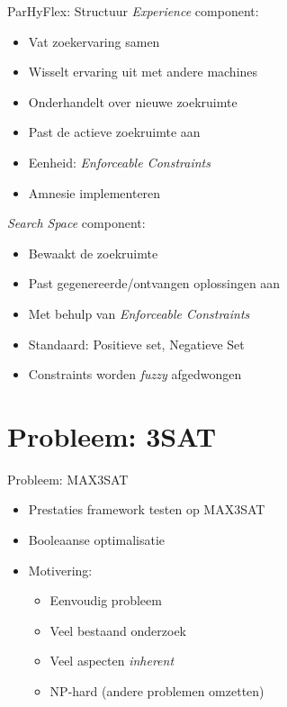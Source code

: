 \documentclass{beamer}
\begin{document}
\begin{frame}{ParHyFlex: Structuur}
\emph{Experience} component:
\begin{itemize}
 \item Vat zoekervaring samen
 \item Wisselt ervaring uit met andere machines
 \item Onderhandelt over nieuwe zoekruimte
 \item Past de actieve zoekruimte aan
 \item Eenheid: \emph{Enforceable Constraints}
 \item Amnesie implementeren
\end{itemize}
\emph{Search Space} component:
\begin{itemize}
 \item Bewaakt de zoekruimte
 \item Past gegenereerde/ontvangen oplossingen aan
 \item Met behulp van \emph{Enforceable Constraints}
 \item Standaard: Positieve set, Negatieve Set
 \item Constraints worden \emph{fuzzy} afgedwongen
\end{itemize}
\end{frame}
\section{Probleem: 3SAT}
\begin{frame}{Probleem: MAX3SAT}
\begin{itemize}
 \item Prestaties framework testen op MAX3SAT
 \item Booleaanse optimalisatie
 \item Motivering:
 \begin{itemize}
  \item Eenvoudig probleem
  \item Veel bestaand onderzoek
  \item Veel aspecten \emph{inherent}
  \item NP-hard (andere problemen omzetten)
 \end{itemize}
\end{itemize}
\end{frame}
\end{document}
